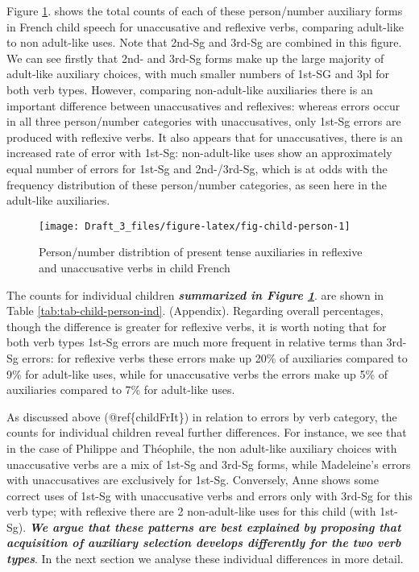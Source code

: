 \documentclass[
  12pt,
]{article}
\begin{document}
Figure \ref{fig:fig-child-person}. shows the total counts of each of these person/number auxiliary forms in French child speech for unaccusative and reflexive verbs, comparing adult-like to non adult-like uses. Note that 2nd-Sg and 3rd-Sg are combined in this figure. We can see firstly that 2nd- and 3rd-Sg forms make up the large majority of adult-like auxiliary choices, with much smaller numbers of 1st-SG and 3pl for both verb types. However, comparing non-adult-like auxiliaries there is an important difference between unaccusatives and reflexives: whereas errors occur in all three person/number categories with unaccusatives, only 1st-Sg errors are produced with reflexive verbs. It also appears that for unaccusatives, there is an increased rate of error with 1st-Sg: non-adult-like uses show an approximately equal number of errors for 1st-Sg and 2nd-/3rd-Sg, which is at odds with the frequency distribution of these person/number categories, as seen here in the adult-like auxiliaries.

\begin{figure}

{\centering \texttt{[image: Draft\_3\_files/figure-latex/fig-child-person-1]} 

}

\caption{Person/number distribtion of present tense auxiliaries in reflexive and unaccusative verbs in child French}\label{fig:fig-child-person}
\end{figure}

The counts for individual children \textbf{\emph{summarized in Figure \ref{fig:fig-child-person}}}. are shown in Table \ref{tab:tab-child-person-ind}. (Appendix). Regarding overall percentages, though the difference is greater for reflexive verbs, it is worth noting that for both verb types 1st-Sg errors are much more frequent in relative terms than 3rd-Sg errors: for reflexive verbs these errors make up 20\% of auxiliaries compared to 9\% for adult-like uses, while for unaccusative verbs the errors make up 5\% of auxiliaries compared to 7\% for adult-like uses.

As discussed above (@ref\{childFrIt\}) in relation to errors by verb category, the counts for individual children reveal further differences. For instance, we see that in the case of Philippe and Théophile, the non adult-like auxiliary choices with unaccusative verbs are a mix of 1st-Sg and 3rd-Sg forms, while Madeleine's errors with unaccusatives are exclusively for 1st-Sg. Conversely, Anne shows some correct uses of 1st-Sg with unaccusative verbs and errors only with 3rd-Sg for this verb type; with reflexive there are 2 non-adult-like uses for this child (with 1st-Sg). \textbf{\emph{We argue that these patterns are best explained by proposing that acquisition of auxiliary selection develops differently for the two verb types}}. In the next section we analyse these individual differences in more detail.
\end{document}
